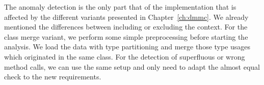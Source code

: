 The anomaly detection is the only part that of the implementation that is affected by the different variants presented in Chapter~\ref{ch:dmmc}.
We already mentioned the differences between including or excluding the context.
For the class merge variant, we perform some simple preprocessing before starting the analysis.
We load the data with type partitioning and merge those type usages which originated in the same class.
For the detection of superfluous or wrong method calls, we can use the same setup and only need to adapt the almost equal check to the new requirements.

